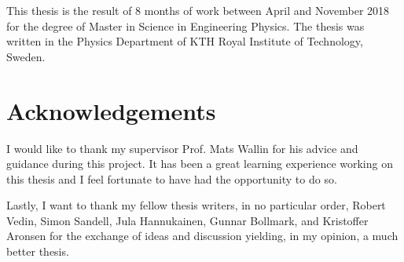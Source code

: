 This thesis is the result of 8 months of work between April and November 2018 for the degree of Master in Science in Engineering Physics. The thesis was written in the Physics Department of KTH Royal Institute of Technology, Sweden.

\section*{Acknowledgements}

I would like to thank my supervisor Prof. Mats Wallin for his advice and guidance during this project. It has been a great learning experience working on this thesis and I feel fortunate to have had the opportunity to do so.

Lastly, I want to thank my fellow thesis writers, in no particular order, Robert Vedin, Simon Sandell, Jula Hannukainen, Gunnar Bollmark, and Kristoffer Aronsen for the exchange of ideas and discussion yielding, in my opinion, a much better thesis.